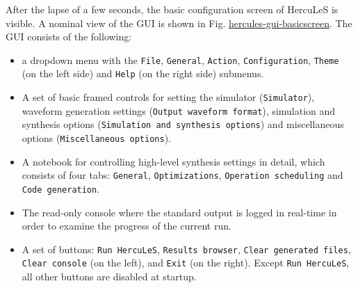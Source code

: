 \documentclass[a4paper]{article}
\begin{document}
After the lapse of a few seconds, the basic configuration screen of HercuLeS is visible. A nominal view of the GUI is shown in Fig. \hyperref[hercules-gui-basicscreen]{hercules-gui-basicscreen}.
The GUI consists of the following:
%
\begin{itemize}

\item a dropdown menu with the \texttt{File}, \texttt{General}, \texttt{Action}, \texttt{Configuration}, \texttt{Theme} (on the left side) and \texttt{Help} (on the right side) submenus.

\item A set of basic framed controls for setting the simulator (\texttt{Simulator}), waveform generation settings (\texttt{Output waveform format}), simulation and synthesis options (\texttt{Simulation and synthesis options}) and miscellaneous options (\texttt{Miscellaneous options}).

\item A notebook for controlling high-level synthesis settings in detail, which consists of four tabs: \texttt{General}, \texttt{Optimizations}, \texttt{Operation scheduling} and \texttt{Code generation}.

\item The read-only console where the standard output is logged in real-time in order to examine the progress of the current run.

\item A set of buttons: \texttt{Run HercuLeS}, \texttt{Results browser}, \texttt{Clear generated files}, \texttt{Clear console} (on the left), and \texttt{Exit} (on the right). Except \texttt{Run HercuLeS}, all other buttons are disabled at startup.

\end{itemize}
\end{document}
